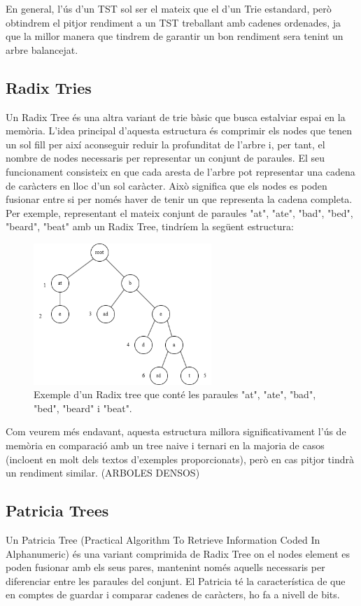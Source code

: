 En general, l'ús d'un TST sol ser el mateix que el d'un Trie estandard, però obtindrem el pitjor rendiment a un TST treballant amb cadenes ordenades, ja que la millor manera que tindrem de garantir un bon rendiment sera tenint un arbre balancejat. 

\subsection{Radix Tries}
Un Radix Tree és una altra variant de trie bàsic que busca estalviar espai en la memòria. L'idea principal d'aquesta estructura és comprimir els nodes que tenen un sol fill per així aconseguir reduir la profunditat de l'arbre i, per tant, el nombre de nodes necessaris per representar un conjunt de paraules.
El seu funcionament consisteix en que cada aresta de l'arbre pot representar una cadena de caràcters en lloc d'un sol caràcter. Això significa que els nodes es poden fusionar entre si per només haver de tenir un que representa la cadena completa. Per exemple, representant el mateix conjunt de paraules {"at", "ate", "bad", "bed", "beard", "beat"} amb un Radix Tree, tindríem la següent estructura:
\begin{figure}[H]
    \centering
    \includegraphics[width=0.6\textwidth]{figures/radix_example.png}
    \caption{Exemple d'un Radix tree que conté les paraules "at", "ate", "bad", "bed", "beard" i "beat".}
    \label{fig:radix_example}
\end{figure}
Com veurem més endavant, aquesta estructura millora significativament l'ús de memòria en comparació amb un tree naive i ternari en la majoria de casos (incloent en molt dels textos d'exemples proporcionats), però en cas pitjor tindrà un rendiment similar. (ARBOLES DENSOS)

\subsection{Patricia Trees}
Un Patricia Tree (Practical Algorithm To Retrieve Information Coded In Alphanumeric) és una variant comprimida de Radix Tree on el nodes element es poden fusionar amb els seus pares, mantenint només aquells necessaris per diferenciar entre les paraules del conjunt.
El Patricia té la característica de que en comptes de guardar i comparar cadenes de caràcters, ho fa a nivell de bits.

